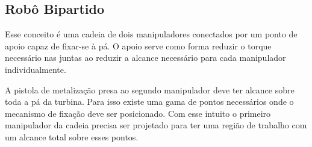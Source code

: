 \subsection{Robô Bipartido}

Esse conceito é uma cadeia de dois manipuladores conectados por um ponto de
apoio capaz de fixar-se à pá. O apoio serve como forma reduzir o torque
necessário nas juntas ao reduzir a alcance necessário para cada manipulador
individualmente.

 A pistola de metalização presa ao segundo manipulador deve ter
alcance sobre toda a pá da turbina. Para isso existe uma gama de pontos
necessários onde o mecanismo de fixação deve ser posicionado. Com esse intuito o
primeiro manipulador da cadeia precisa ser projetado para ter uma região de
trabalho com um alcance total sobre esses pontos.

